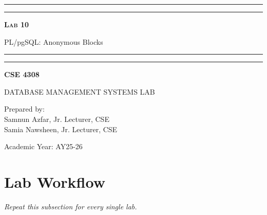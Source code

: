 \documentclass[12pt,a4paper]{article}
\newcommand{\labNo}{Lab 10}
\newcommand{\labTopic}{PL/pgSQL: Anonymous Blocks}
\newcommand{\courseCode}{CSE 4308}
\newcommand{\courseTitleLong}{DATABASE MANAGEMENT SYSTEMS LAB}
\newcommand{\instructorName}{Samnun Azfar, Jr. Lecturer, CSE\\ Samia Nawsheen, Jr. Lecturer, CSE}
\newcommand{\academicYear}{AY25-26}
\begin{document}
\begin{titlepage}
    \centering
    \vspace*{2\baselineskip}

    \rule{14cm}{2pt}\vspace*{-0.8\baselineskip}\vspace*{1.5pt}
    \rule{14cm}{0.5pt}\vspace{2\baselineskip}

    {\Huge\bfseries\scshape \labNo\par} %
    \vspace{3mm}
    {\Large \labTopic} %
    \vspace{3mm}

    \rule{14cm}{0.5pt}\vspace*{-0.7\baselineskip}\vspace{2.5pt}
    \rule{14cm}{2pt}

    \vspace{2\baselineskip}

    {\Large\bfseries \courseCode\par} %
    \vspace{1\baselineskip}
    {\large \courseTitleLong\par} %

    \vfill
    {\normalsize Prepared by:\\ \instructorName\par} %
    {\normalsize Academic Year: \academicYear\par} %
\end{titlepage}

\newpage
\tableofcontents
\newpage

\section{Lab Workflow}



\textit{Repeat this subsection for every single lab.}
\end{document}

